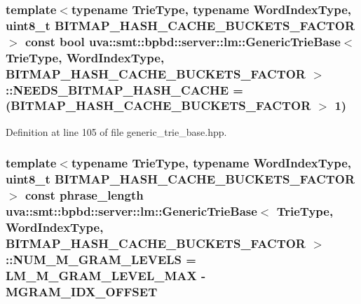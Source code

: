 \subsubsection[{N\+E\+E\+D\+S\+\_\+\+B\+I\+T\+M\+A\+P\+\_\+\+H\+A\+S\+H\+\_\+\+C\+A\+C\+H\+E}]{\setlength{\rightskip}{0pt plus 5cm}template$<$typename Trie\+Type, typename Word\+Index\+Type, uint8\+\_\+t B\+I\+T\+M\+A\+P\+\_\+\+H\+A\+S\+H\+\_\+\+C\+A\+C\+H\+E\+\_\+\+B\+U\+C\+K\+E\+T\+S\+\_\+\+F\+A\+C\+T\+O\+R$>$ const bool {\bf uva\+::smt\+::bpbd\+::server\+::lm\+::\+Generic\+Trie\+Base}$<$ Trie\+Type, {\bf Word\+Index\+Type}, B\+I\+T\+M\+A\+P\+\_\+\+H\+A\+S\+H\+\_\+\+C\+A\+C\+H\+E\+\_\+\+B\+U\+C\+K\+E\+T\+S\+\_\+\+F\+A\+C\+T\+O\+R $>$\+::N\+E\+E\+D\+S\+\_\+\+B\+I\+T\+M\+A\+P\+\_\+\+H\+A\+S\+H\+\_\+\+C\+A\+C\+H\+E = (B\+I\+T\+M\+A\+P\+\_\+\+H\+A\+S\+H\+\_\+\+C\+A\+C\+H\+E\+\_\+\+B\+U\+C\+K\+E\+T\+S\+\_\+\+F\+A\+C\+T\+O\+R $>$ 1)\hspace{0.3cm}{\ttfamily [static]}}\label{classuva_1_1smt_1_1bpbd_1_1server_1_1lm_1_1_generic_trie_base_a2b5781fbca37e23d15d0bfda78084984}


Definition at line 105 of file generic\+\_\+trie\+\_\+base.\+hpp.

\hypertarget{classuva_1_1smt_1_1bpbd_1_1server_1_1lm_1_1_generic_trie_base_aafc76eab16ca2e35293bcd0e1764394a}{}
\subsubsection[{N\+U\+M\+\_\+\+M\+\_\+\+G\+R\+A\+M\+\_\+\+L\+E\+V\+E\+L\+S}]{\setlength{\rightskip}{0pt plus 5cm}template$<$typename Trie\+Type, typename Word\+Index\+Type, uint8\+\_\+t B\+I\+T\+M\+A\+P\+\_\+\+H\+A\+S\+H\+\_\+\+C\+A\+C\+H\+E\+\_\+\+B\+U\+C\+K\+E\+T\+S\+\_\+\+F\+A\+C\+T\+O\+R$>$ const {\bf phrase\+\_\+length} {\bf uva\+::smt\+::bpbd\+::server\+::lm\+::\+Generic\+Trie\+Base}$<$ Trie\+Type, {\bf Word\+Index\+Type}, B\+I\+T\+M\+A\+P\+\_\+\+H\+A\+S\+H\+\_\+\+C\+A\+C\+H\+E\+\_\+\+B\+U\+C\+K\+E\+T\+S\+\_\+\+F\+A\+C\+T\+O\+R $>$\+::N\+U\+M\+\_\+\+M\+\_\+\+G\+R\+A\+M\+\_\+\+L\+E\+V\+E\+L\+S = L\+M\+\_\+\+M\+\_\+\+G\+R\+A\+M\+\_\+\+L\+E\+V\+E\+L\+\_\+\+M\+A\+X -\/ {\bf M\+G\+R\+A\+M\+\_\+\+I\+D\+X\+\_\+\+O\+F\+F\+S\+E\+T}\hspace{0.3cm}{\ttfamily [static]}}\label{classuva_1_1smt_1_1bpbd_1_1server_1_1lm_1_1_generic_trie_base_aafc76eab16ca2e35293bcd0e1764394a}


